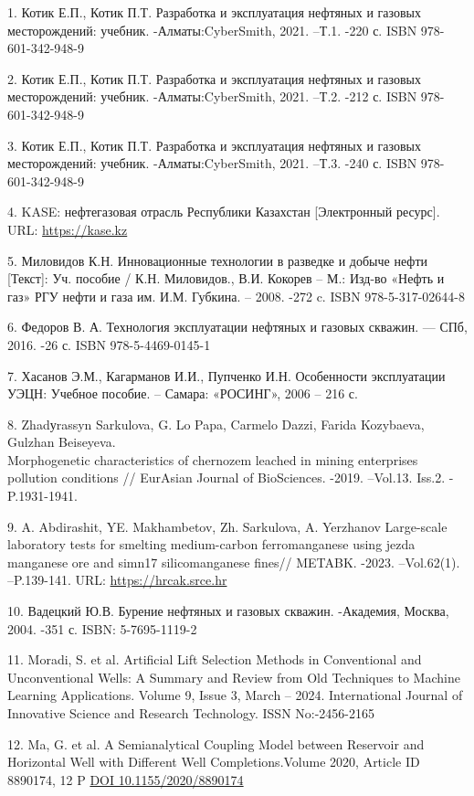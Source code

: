 \begin{references}
1. Котик Е.П., Котик П.Т. Разработка и эксплуатация нефтяных и газовых
месторождений: учебник. -Алматы:CyberSmith, 2021. --Т.1. -220 с. ISBN
978-601-342-948-9

2. Котик Е.П., Котик П.Т. Разработка и эксплуатация нефтяных и газовых
месторождений: учебник. -Алматы:CyberSmith, 2021. --Т.2. -212 с. ISBN
978-601-342-948-9

3. Котик Е.П., Котик П.Т. Разработка и эксплуатация нефтяных и газовых
месторождений: учебник. -Алматы:CyberSmith, 2021. --Т.3. -240 с. ISBN
978-601-342-948-9

4. KASE: нефтегазовая отрасль Республики Казахстан {[}Электронный
ресурс{]}. URL:
\href{https://kase.kz/files/presentations/ru/KASE_OilGas_industry_2019.pdf}{https://kase.kz}

5. Миловидов К.Н. Инновационные технологии в разведке и добыче нефти
{[}Текст{]}: Уч. пособие / К.Н. Миловидов., В.И. Кокорев -- М.: Изд-во
«Нефть и газ» РГУ нефти и газа им. И.М. Губкина. -- 2008. -272 c. ISBN
978-5-317-02644-8

6. Федоров В. А. Технология эксплуатации нефтяных и газовых скважин. ---
СПб, 2016. -26 с. ISBN 978-5-4469-0145-1

7. Хасанов Э.М., Кагарманов И.И., Пупченко И.Н. Особенности эксплуатации
УЭЦН: Учебное пособие. -- Самара: «РОСИНГ», 2006 -- 216 с.

8. Zhadуrassyn Sarkulova, G. Lo Papa, Carmelo Dazzi, Farida Kozybaeva,
Gulzhan Beiseyeva. \\Morphogenetic characteristics of chernozem leached
in mining enterprises pollution conditions // EurAsian Journal of
BioSciences. -2019. --Vol.13. Iss.2. - P.1931-1941.

9. A. Abdirashit, YE. Makhambetov, Zh. Sarkulova, A. Yerzhanov
Large-scale laboratory tests for smelting medium-carbon ferromanganese
using jezda manganese ore and simn17 silicomanganese fines// METABK.
-2023. --Vol.62(1). --P.139-141. URL:
\href{https://hrcak.srce.hr/file/407990}{https://hrcak.srce.hr}

10. Вадецкий Ю.В. Бурение нефтяных и газовых скважин. -Академия, Москва,
2004. -351 с. ISBN: 5-7695-1119-2

11. Moradi, S. et al. Artificial Lift Selection Methods in Conventional
and Unconventional Wells: A Summary and Review from Old Techniques to
Machine Learning Applications. Volume 9, Issue 3, March -- 2024.
International Journal of Innovative Science and Research Technology.
ISSN No:-2456-2165

12. Ma, G. et al. A Semianalytical Coupling Model between Reservoir and
Horizontal Well with Different Well Completions.Volume 2020, Article
ID 8890174, 12 P \href{https://doi.org/10.1155/2020/8890174}{DOI 10.1155/2020/8890174}
\end{references}

